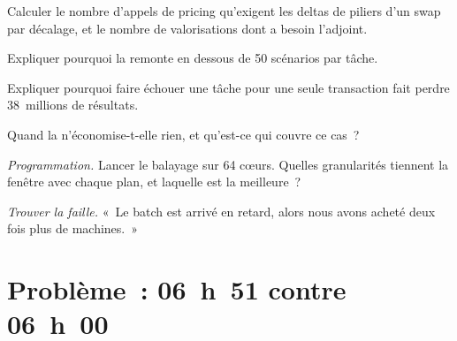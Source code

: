 \begin{exercise}[$\star$]\label{exo:pl:the-risk-grid:3}
Calculer le nombre d'appels de pricing qu'exigent les deltas de piliers d'un swap par décalage, et le nombre de valorisations dont a besoin l'adjoint.
\end{exercise}

\begin{exercise}[$\star\star$]\label{exo:pl:the-risk-grid:4}
Expliquer pourquoi la  remonte en dessous de 50 scénarios par tâche.
\end{exercise}

\begin{exercise}[$\star\star$]\label{exo:pl:the-risk-grid:5}
Expliquer pourquoi faire échouer une tâche pour une seule transaction fait perdre 38~millions de résultats.
\end{exercise}

\begin{exercise}[$\star\star$]\label{exo:pl:the-risk-grid:6}
Quand la  n'économise-t-elle rien, et qu'est-ce qui couvre ce cas~?
\end{exercise}

\begin{exercise}[$\star\star\star$]\label{exo:pl:the-risk-grid:7}
\emph{Programmation.} Lancer le balayage sur 64 cœurs. Quelles granularités tiennent la fenêtre avec chaque plan, et laquelle est la meilleure~?
\end{exercise}

\begin{exercise}[$\star\star\star$]\label{exo:pl:the-risk-grid:8}
\emph{Trouver la faille.} «~Le batch est arrivé en retard, alors nous avons acheté deux fois plus de machines.~»
\end{exercise}

\section{Problème~: 06~h~51 contre 06~h~00}

